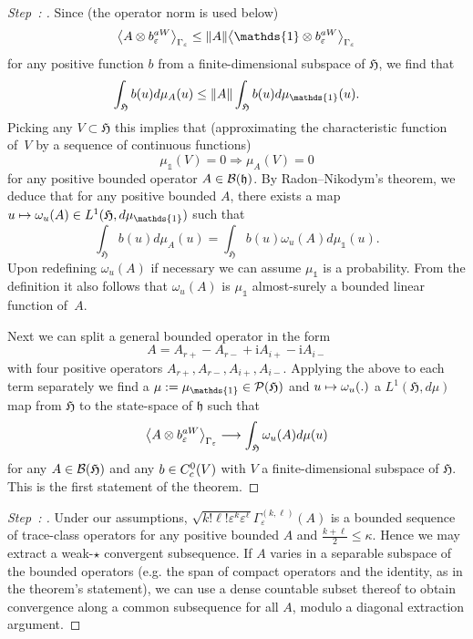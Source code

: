 \documentclass[AHL,Unicode,longabstracts,published]{cedram}
\newcommand{\im}{\mathrm{i}}
\newcommand{\gH}{\mathfrak{H}}
\newcommand{\gh}{\mathfrak{h}}
\newcommand{\cB}{\mathcal{B}}
\newcommand{\cP}{\mathcal{P}}
\newcommand{\1}{\mathds{1}}
\newcommand{\eps}{\varepsilon}
\let\oldin\in
\renewcommand{\in}{\mathchoice{\oldin}{\oldin}{\,\oldin\,}{\,\oldin\,}}
\renewcommand*{\to}{\mathchoice{\longrightarrow}{\rightarrow}{\rightarrow}{\rightarrow}}
\let\oldmapsto\mapsto
\renewcommand*{\mapsto}{\mathchoice{\longmapsto}{\oldmapsto}{\oldmapsto}{\oldmapsto}}
\newcounter{setofstep}
\newcounter{step}[setofstep]
\newenvironment{step}[1][]{\refstepcounter{step}\begin{proof}[{Step~\thestep\if#1\empty\else: #1\fi}]}{\let\qed\relax\end{proof}}
\let\originalleft\left
\let\originalright\right
\renewcommand{\left}{\mathopen{}\mathclose\bgroup\originalleft}
\renewcommand{\right}{\aftergroup\egroup\originalright}
\begin{document}
\begin{proofc}
\begin{step}
Since (the operator norm is used below)
\begin{equation*}
\left\langle A \otimes b_{\eps}^{aW}\right\rangle _{\Gamma_\eps} \leq \left\| A \right\| \left\langle \1 \otimes b_{\eps}^{aW}\right\rangle _{\Gamma_\eps}
\end{equation*}
for any positive function $b$ from a finite-dimensional subspace of $\gH$, we find that
\begin{equation*}
\int_ \gH b(u) d\mu_A (u) \leq \left\| A \right\| \int_ \gH b(u) d\mu_\1 (u).
\end{equation*}
Picking any $V \subset \gH$ this implies that (approximating the characteristic function of~$V$ by a sequence of continuous functions)
\begin{equation*}
\mu_\1 (V) = 0 \Rightarrow \mu_A (V) = 0
\end{equation*}
for any positive
bounded operator $A\in \cB (\gh)$. By Radon--Nikodym's theorem, we deduce that for any positive bounded $A$, there exists a map $u\mapsto\omega_u (A) \in L^1 (\gH, d\mu_\1)$ such that
\begin{equation*}
\int_ \gH b(u) d\mu_A (u) = \int_ \gH b(u) \omega_u(A) d\mu_\1 (u).
\end{equation*}
Upon redefining $\omega_u(A)$ if necessary we can assume $\mu_\1$ is a probability. From the definition it also follows that $\omega_u(A)$ is $\mu_\1$ almost-surely a bounded linear function of~$A$.

Next we can split a general bounded operator in the form
\begin{equation}\label{eq:split op}
A = A_{r+} - A_{r-} + \im A_{i+} - \im A_{i-}
\end{equation}
with four positive operators $A_{r+},A_{r-},A_{i+},A_{i-}$. Applying the above to each term separately we find a $\mu:= \mu_\1 \in \cP(\gH)$ and $u\mapsto \omega_u (.)$ a $L^1 (\gH,d\mu)$ map from $\gH$ to the state-space of $\gh$ such that
\begin{equation*}
\left\langle A \otimes b_{\eps}^{aW}\right\rangle _{\Gamma_\eps} \to \int_ \gH \omega_u(A) d\mu (u)
\end{equation*}
for any $A\in \cB(\gH)$ and any $b\in C^0_c (V)$ with $V$ a finite-dimensional subspace of $\gH$. This is the first statement of the theorem.
\end{step}

\begin{step}
Under our assumptions, $\sqrt{k! \ell ! \eps ^k \eps^\ell}\Gamma_\eps ^{(k,\ell)} (A)$ is a bounded sequence of trace-class operators for any positive bounded $A$ and $\frac{k+\ell}{2}\leq \kappa$. Hence we may extract a weak-$\star$ convergent subsequence. If $A$ varies in a separable subspace of the bounded operators (e.g. the span of compact operators and the identity, as in the theorem's statement), we can use a dense countable subset thereof to obtain convergence along a common subsequence for all $A$, modulo a diagonal extraction argument.


\end{step}
\end{proofc}
\end{document}
